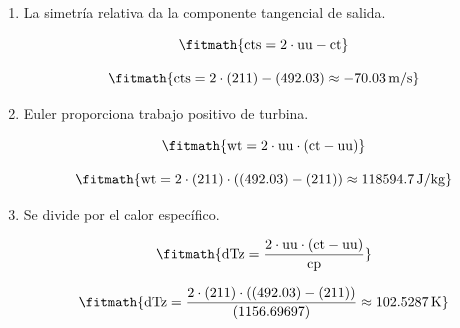 \begin{enumerate}

\item La simetría relativa da la componente tangencial de salida.

\[\fitmath{\mathrm{cts}=2\cdot \mathrm{uu}-\mathrm{ct}}\]

\[\fitmath{\mathrm{cts}=2\cdot (211)-(492.03)\approx -70.03\,\mathrm{m/s}}\]

\item Euler proporciona trabajo positivo de turbina.

\[\fitmath{\mathrm{wt}=2\cdot \mathrm{uu}\cdot \left(\mathrm{ct}-\mathrm{uu}\right)}\]

\[\fitmath{\mathrm{wt}=2\cdot (211)\cdot \left((492.03)-(211)\right)\approx 118594.7\,\mathrm{J/kg}}\]

\item Se divide por el calor específico.

\[\fitmath{\mathrm{dTz}=\frac{2\cdot \mathrm{uu}\cdot \left(\mathrm{ct}-\mathrm{uu}\right)}{\mathrm{cp}}}\]

\[\fitmath{\mathrm{dTz}=\frac{2\cdot (211)\cdot \left((492.03)-(211)\right)}{(1156.69697)}\approx 102.5287\,\mathrm{K}}\]

\end{enumerate}
